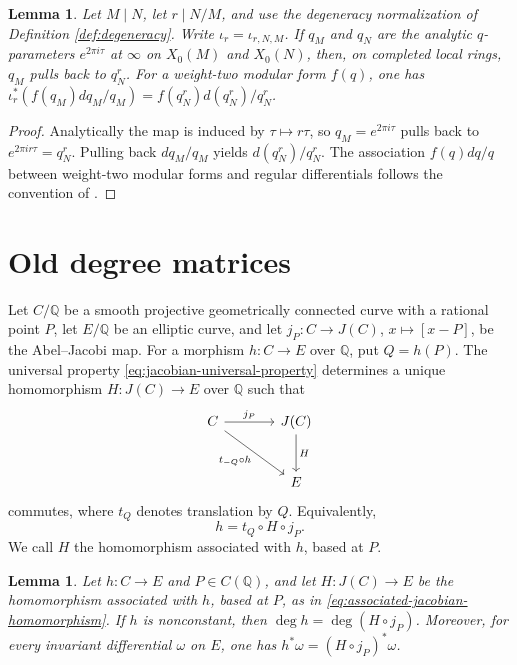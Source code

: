 \documentclass[12pt, letterpaper]{amsart}
\newtheorem{lemma}[theorem]{Lemma}
\theoremstyle{definition}
\theoremstyle{remark}
\newcommand{\Q}{\mathbb Q}
\numberwithin{equation}{section}
\begin{document}
\begin{lemma}\label{lem:q-expansion-degeneracy}
Let \(M\mid N\), let \(r\mid N/M\), and use the degeneracy normalization of
Definition \ref{def:degeneracy}. Write \(\iota_r=\iota_{r,N,M}\). If \(q_M\)
and \(q_N\) are the analytic
\(q\)-parameters \(e^{2\pi i\tau}\) at \(\infty\) on \(X_0(M)\) and \(X_0(N)\),
then, on completed local rings, \(q_M\) pulls back to \(q_N^r\). For a weight-two
modular form \(f(q)\), one has
\(\iota_r^{*}(f(q_M)dq_M/q_M)=f(q_N^r)d(q_N^r)/q_N^r\).
\end{lemma}

\begin{proof}
Analytically the map is induced by \(\tau\mapsto r\tau\), so
\(q_M=e^{2\pi i\tau}\) pulls back to \(e^{2\pi i r\tau}=q_N^r\). Pulling back
\(dq_M/q_M\) yields \(d(q_N^r)/q_N^r\). The association
\(f(q)dq/q\) between weight-two modular forms and regular differentials follows
the convention of \cite{Stein}.
\end{proof}

\section{Old degree matrices}\label{sec:old-degree-form}
Let \(C/\Q\) be a smooth projective geometrically connected curve with a rational
point \(P\), let \(E/\Q\) be an elliptic curve, and let
\(j_P:C\to J(C)\), \(x\mapsto [x-P]\), be the Abel--Jacobi map. For a morphism
\(h:C\to E\) over \(\Q\), put \(Q=h(P)\). The universal property
\eqref{eq:jacobian-universal-property} determines a unique homomorphism
\(H:J(C)\to E\) over \(\Q\) such that
\[
\begin{tikzcd}[column sep=large,row sep=large]
C \arrow[r,"j_P"] \arrow[dr,"{t_{-Q}\circ h}"'] &
J(C) \arrow[d,"H"] \\
& E
\end{tikzcd}
\]
commutes, where \(t_Q\) denotes translation by \(Q\). Equivalently,
\begin{equation}\label{eq:associated-jacobian-homomorphism}
        h=t_Q\circ H\circ j_P.
\end{equation}
We call \(H\) the homomorphism associated with \(h\), based at \(P\).

\begin{lemma}\label{lem:curve-jacobian}
Let \(h:C\to E\) and \(P\in C(\Q)\), and let
\(H:J(C)\to E\) be the homomorphism
associated with \(h\), based at \(P\), as in
\eqref{eq:associated-jacobian-homomorphism}. If \(h\) is nonconstant, then
\(\deg h=\deg(H\circ j_P)\). Moreover, for every invariant differential
\(\omega\) on \(E\), one has \(h^*\omega=(H\circ j_P)^*\omega\).
\end{lemma}
\end{document}
